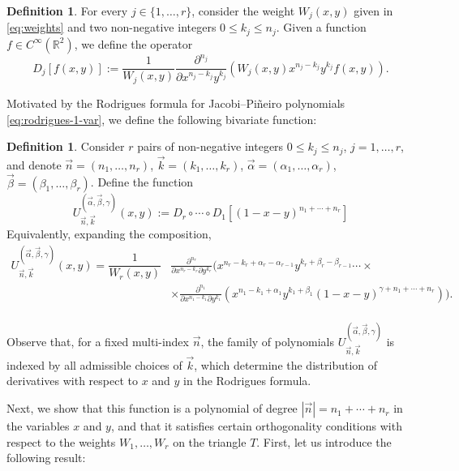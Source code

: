 \documentclass[11pt,reqno]{amsart}
\theoremstyle{definition}
\newtheorem{definition}[theorem]{Definition}
\begin{document}
\begin{definition}
    For every $j\in\{1,\dots,r\}$, consider the weight $W_j(x,y)$ given in \eqref{eq:weights} and two non-negative integers $0\leq k_j\leq n_j$. Given a function $f\in C^\infty(\mathbb R^2)$, we define the operator
    \begin{equation}
    \label{eq:operator-D_j}
        D_{j}[f(x,y)]:=\dfrac{1}{W_j(x,y)}\dfrac{\partial^{n_j}}{\partial x^{n_j-k_j}y^{k_j}}\left(W_j(x,y) x^{n_j-k_j} y^{k_j} f(x,y)\right).
    \end{equation}
\end{definition}

Motivated by the Rodrigues formula for Jacobi--Piñeiro polynomials \eqref{eq:rodrigues-1-var}, we define the following bivariate function:

\begin{definition} Consider $r$ pairs of non-negative integers $0\leq k_j \leq n_j$, $j=1,\dots,r$, and denote $\vec n =(n_1,\dots,n_r)$, $\vec k=(k_1,\dots,k_r)$, $\vec\alpha=(\alpha_1,\dots,\alpha_r)$, $\vec\beta=(\beta_1,\dots,\beta_r)$. Define the function
\begin{equation}
\label{eq:pol-definition-r-measures}
U^{(\vec \alpha,\vec \beta,\gamma)}_{\vec n,\vec k}(x,y) := D_r\circ\cdots\circ D_1[(1-x-y)^{n_1+\cdots +n_r}]
\end{equation}
Equivalently, expanding the composition,
\begin{equation*}
\begin{split}
	U^{(\vec \alpha,\vec \beta,\gamma)}_{\vec n,\vec k}(x,y)  = \dfrac{1}{W_r(x,y)} &\frac{\partial^{n_r}}{\partial x^{n_r-k_r}\partial y^{k_r}}\Big(x^{n_r-k_r+\alpha_r-\alpha_{r-1}}y^{k_r+\beta_r-\beta_{r-1}}  \cdots \times \\ & \times  \frac{\partial^{n_1}}{\partial x^{n_1-k_1}\partial y^{k_1}}(x^{n_1-k_1+\alpha_1}y^{k_1+\beta_1}(1-x-y)^{\gamma+n_1+\cdots+n_r})\Big).\\
\end{split}
\end{equation*}
\end{definition}

Observe that, for a fixed multi-index $\vec n$, the family of polynomials
$U^{(\vec\alpha,\vec\beta,\gamma)}_{\vec n,\vec k}$ is indexed by all admissible
choices of $\vec k$, which determine the distribution of derivatives with respect to $x$ and $y$ in the Rodrigues formula.

Next, we show that this function is a polynomial of degree $|\vec n|=n_1+\cdots+n_r$ in the variables $x$ and $y$, and that it satisfies certain orthogonality conditions with respect to the weights $W_1,\dots, W_r$ on the triangle $T$. First, let us introduce the following result:
\end{document}
